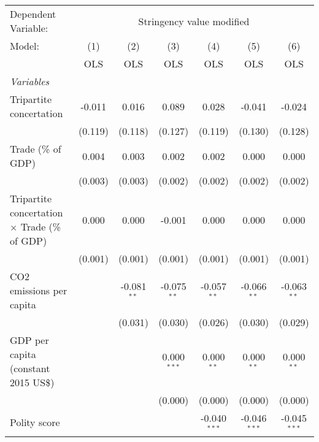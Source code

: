 
\begingroup
\centering
\begin{tabular}{lcccccc}
   \toprule
   Dependent Variable: & \multicolumn{6}{c}{Stringency value modified}\\
   Model:                                               & (1)     & (2)           & (3)           & (4)            & (5)            & (6)\\  
                                                        &  OLS    & OLS           & OLS           & OLS            & OLS            & OLS\\  
   \midrule
   \emph{Variables}\\
   Tripartite concertation                              & -0.011  & 0.016         & 0.089         & 0.028          & -0.041         & -0.024\\   
                                                        & (0.119) & (0.118)       & (0.127)       & (0.119)        & (0.130)        & (0.128)\\   
   Trade (\% of GDP)                                    & 0.004   & 0.003         & 0.002         & 0.002          & 0.000          & 0.000\\   
                                                        & (0.003) & (0.003)       & (0.002)       & (0.002)        & (0.002)        & (0.002)\\   
   Tripartite concertation $\times$ Trade (\% of GDP)   & 0.000   & 0.000         & -0.001        & 0.000          & 0.000          & 0.000\\   
                                                        & (0.001) & (0.001)       & (0.001)       & (0.001)        & (0.001)        & (0.001)\\   
   CO2 emissions per capita                             &         & -0.081$^{**}$ & -0.075$^{**}$ & -0.057$^{**}$  & -0.066$^{**}$  & -0.063$^{**}$\\   
                                                        &         & (0.031)       & (0.030)       & (0.026)        & (0.030)        & (0.029)\\   
   GDP per capita (constant 2015 US\$)                  &         &               & 0.000$^{***}$ & 0.000$^{**}$   & 0.000$^{**}$   & 0.000$^{**}$\\   
                                                        &         &               & (0.000)       & (0.000)        & (0.000)        & (0.000)\\   
   Polity score                                         &         &               &               & -0.040$^{***}$ & -0.046$^{***}$ & -0.045$^{***}$\\   

\end{tabular}
